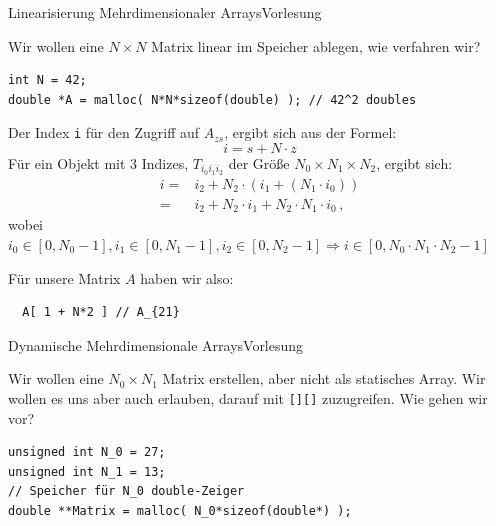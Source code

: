 \documentclass[xcolor=dvipsnames]{beamer}
\newcounter{lecturecounter}
\begin{document}
\begin{frame}[fragile]{Linearisierung Mehrdimensionaler Arrays}{Vorlesung }
\begin{block}{}
  Wir wollen eine $N \times N$ Matrix linear im Speicher ablegen, wie verfahren wir?
\end{block}
\begin{lstlisting}
int N = 42;
double *A = malloc( N*N*sizeof(double) ); // 42^2 doubles
\end{lstlisting}
Der Index \texttt{i} für den Zugriff auf $A_{zs}$, ergibt sich aus der Formel:
\begin{equation*}
  i = s + N \cdot z
\end{equation*}
Für ein Objekt mit $3$ Indizes, $T_{i_0 i_1 i_2}$ der Größe $N_0 \times N_1 \times N_2$, ergibt sich:
\begin{align*}
  i = & i_2 + N_2 \cdot ( i_1 + ( N_1 \cdot i_0 ) ) \\
    = & i_2 + N_2 \cdot i_1 + N_2 \cdot N_1 \cdot i_0 \, ,
\end{align*}
wobei $i_0 \in [ 0, N_0-1 ], i_1 \in [ 0, N_1-1 ], i_2 \in [ 0, N_2-1 ] \Rightarrow i \in [ 0, N_0 \cdot N_1 \cdot N_2 - 1 ]$
\begin{block}{}
  Für unsere Matrix $A$ haben wir also:
\end{block}
\begin{lstlisting}
  A[ 1 + N*2 ] // A_{21}
\end{lstlisting}
\end{frame}

\begin{frame}[fragile]{Dynamische Mehrdimensionale Arrays}{Vorlesung }
\begin{block}{}
  Wir wollen eine $N_0 \times N_1$ Matrix erstellen, aber nicht als statisches Array. Wir wollen es uns aber auch erlauben, darauf mit \texttt{[][]} zuzugreifen. Wie gehen wir vor?
\end{block}
\begin{lstlisting}
unsigned int N_0 = 27;
unsigned int N_1 = 13;
// Speicher für N_0 double-Zeiger
double **Matrix = malloc( N_0*sizeof(double*) ); 
\end{lstlisting}

\end{frame}
\end{document}
